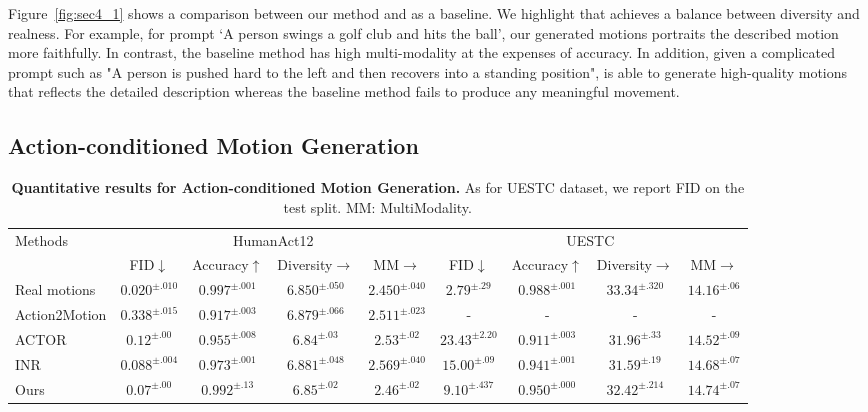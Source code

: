 Figure~\ref{fig:sec4_1} shows a comparison between our method and \cite{guo2022generating} as a baseline. We highlight that \name achieves a balance between diversity and realness. For example, for prompt `A person swings a golf club and hits the ball', our generated motions portraits the described motion more faithfully. In contrast, the baseline method has high multi-modality at the expenses of accuracy. In addition, given a complicated prompt such as "A person is pushed hard to the left and then recovers into a standing position", \name is able to generate high-quality motions that reflects the detailed description whereas the baseline method fails to produce any meaningful movement.

\subsection{Action-conditioned Motion Generation}\label{sec4_2}

\begin{table*}[ht]
\centering
\caption{\textbf{Quantitative results for Action-conditioned Motion Generation.} As for UESTC dataset, we report FID on the test split. MM: MultiModality.}
\label{tab:action}
\setlength{\tabcolsep}{1.4mm}
{
\begin{tabular}{lcccccccc}
\hline

\multirow{2}{2cm}{\centering Methods} & \multicolumn{4}{c}{\centering HumanAct12} & \multicolumn{4}{c}{\centering UESTC} \\

& FID$\downarrow$ & Accuracy$\uparrow$ & Diversity$\rightarrow$ &  MM$\rightarrow$ & FID$\downarrow$ & Accuracy$\uparrow$ &  Diversity$\rightarrow$ &  MM$\rightarrow$ \\

\hline
Real motions & $0.020^{\pm.010}$ & $0.997^{\pm.001}$ & $6.850^{\pm.050}$ & $2.450^{\pm.040}$ & $2.79^{\pm.29}$ & $0.988^{\pm.001}$ & $33.34^{\pm.320}$ & $14.16^{\pm.06}$\\ 
\hline
Action2Motion & $0.338^{\pm.015}$ & $0.917^{\pm.003}$ & $6.879^{\pm.066}$ & $2.511^{\pm.023}$ & - & - & - & - \\
ACTOR & $0.12^{\pm.00}$ & $0.955^{\pm.008}$ & $6.84^{\pm.03}$ & $2.53^{\pm.02}$ & $23.43^{\pm2.20}$ & $0.911^{\pm.003}$ & $31.96^{\pm .33}$ & $\mathbf{14.52^{\pm.09}}$ \\
INR & $0.088^{\pm.004}$ & $0.973^{\pm.001}$ & $6.881^{\pm.048}$ & $2.569^{\pm.040}$ & $15.00^{\pm.09}$ & $0.941^{\pm.001}$ & $31.59^{\pm.19}$ & $14.68^{\pm.07}$ \\

\hline
Ours & $\mathbf{0.07^{\pm.00}}$ & $\mathbf{0.992^{\pm.13}}$ & $\mathbf{6.85^{\pm.02}}$ & $\mathbf{2.46^{\pm.02}}$ & $\mathbf{9.10^{\pm.437}}$ & $\mathbf{0.950^{\pm.000}}$ & $\mathbf{32.42^{\pm.214}}$ & $14.74^{\pm.07}$ \\
\hline
\end{tabular}}
\end{table*}

